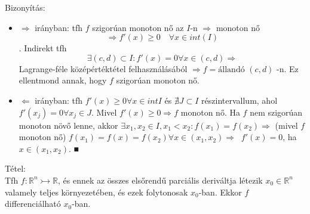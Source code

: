 \documentclass[12pt,a4paper]{scrartcl}
\providecommand{\tightlist}{%
  \setlength{\itemsep}{0pt}\setlength{\parskip}{0pt}}
\newenvironment{tetel}{}{}
\newenvironment{bizonyitas}{}{}
\begin{document}
\begin{bizonyitas}

Bizonyítás:

\begin{itemize}
\tightlist
\item
  \(\Rightarrow\) irányban: tfh \(f\) szigorúan monoton nő az \(I\)-n
  \(\Rightarrow\) monoton nő
  \[\left. \Rightarrow f'\left( x \right) \geq 0\quad\forall x \in {int}\left( I \right) \right.\].
  Indirekt tfh
  \[\left. \exists\left( {c,d} \right) \subset I:f'\left( x \right) = 0\forall x \in \left( {c,d} \right)\Rightarrow \right.\]
  Lagrange-féle középértéktétel felhasználásából
  \(\left. \Rightarrow f = \text{állandó} \right.\)
  \(\left( {c,d} \right)\) -n. Ez ellentmond annak, hogy \(f\) szigorúan
  monoton nő.
\item
  \(\Leftarrow\) irányban: tfh
  \(f'\left( x \right) \geq 0\forall x \in {int}I\) és
  \(\nexists J \subset I\) részintervallum, ahol
  \(f'\left( x_{j} \right) = 0\forall x_{j} \in J\). Mivel
  \(\left. f'\left( x \right) \geq 0\Rightarrow f \right.\) monoton nő.
  Ha \(f\) nem szigorúan monoton növő lenne, akkor
  \(\left. \exists x_{1},x_{2} \in I,x_{1} < x_{2}:f\left( x_{1} \right) = f\left( x_{2} \right)\Rightarrow \right.\)
  (mivel \(f\) monoton nő)
  \(\left. f\left( x_{1} \right) = f\left( x \right) = f\left( x_{2} \right)\forall x \in \left( {x_{1},x_{2}} \right)\Rightarrow\operatorname{}f'\left( x \right) = 0 \right.\),
  ha \(x \in \left( {x_{1},x_{2}} \right)\). ■
\end{itemize}

\end{bizonyitas}

\begin{tetel}

Tétel:\\
Tfh \(\left. f:{\mathbb{R}}^{n}\rightarrowtail{\mathbb{R}} \right.\), és
ennek az összes elsőrendű parciális deriváltja létezik
\(x_{0} \in {\mathbb{R}}^{n}\) valamely teljes környezetében, és ezek
folytonosak \(x_{0}\)-ban. Ekkor \(f\) differenciálható \(x_{0}\)-ban.

\end{tetel}
\end{document}
